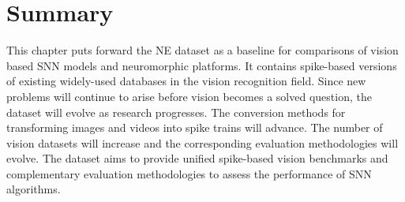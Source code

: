 \section{Summary}
\label{sec:summ}
This chapter puts forward the NE dataset as a baseline for comparisons of vision based SNN models and neuromorphic platforms.
It contains spike-based versions of existing widely-used databases in the vision recognition field.
Since new problems will continue to arise before vision becomes a solved question, the dataset will evolve as research progresses. 
The conversion methods for transforming images and videos into spike trains will advance. The number of vision datasets will increase and the corresponding evaluation methodologies will evolve.
The dataset aims to provide unified spike-based vision benchmarks and complementary evaluation methodologies to assess the performance of SNN algorithms.

